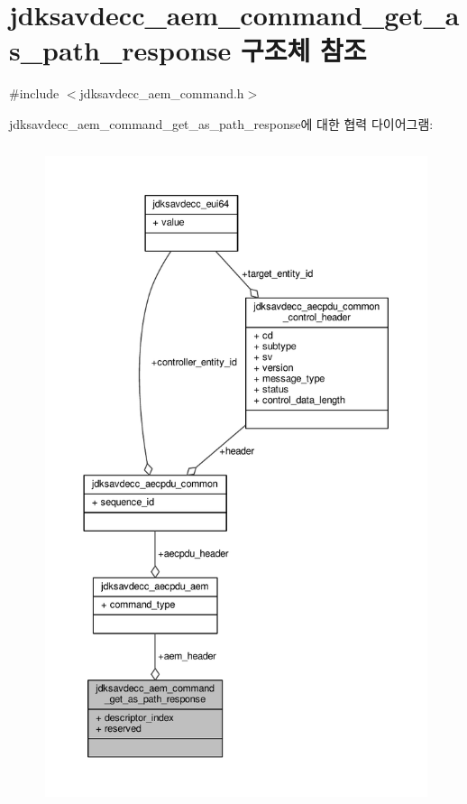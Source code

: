 \hypertarget{structjdksavdecc__aem__command__get__as__path__response}{}\section{jdksavdecc\+\_\+aem\+\_\+command\+\_\+get\+\_\+as\+\_\+path\+\_\+response 구조체 참조}
\label{structjdksavdecc__aem__command__get__as__path__response}


{\ttfamily \#include $<$jdksavdecc\+\_\+aem\+\_\+command.\+h$>$}



jdksavdecc\+\_\+aem\+\_\+command\+\_\+get\+\_\+as\+\_\+path\+\_\+response에 대한 협력 다이어그램\+:
\nopagebreak
\begin{figure}[H]
\begin{center}
\leavevmode
\includegraphics[height=550pt]{structjdksavdecc__aem__command__get__as__path__response__coll__graph}
\end{center}
\end{figure}
